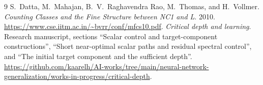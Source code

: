 \documentclass[11pt]{article}
\theoremstyle{remark}\newtheorem{remark}[theorem]{Remark}
\begin{document}
\begin{thebibliography}{9}
S.~Datta, M.~Mahajan, B.~V.~Raghavendra Rao, M.~Thomas, and H.~Vollmer.
\emph{Counting Classes and the Fine Structure between NC1 and L}.
2010. \url{https://www.cse.iitm.ac.in/~bvrr/conf/mfcs10.pdf}.
\emph{Critical depth and learning}.
Research manuscript, sections ``Scalar control and target-component
constructions'', ``Short near-optimal scalar paths and residual spectral
control'', and ``The initial target component and the sufficient depth''.
\url{https://github.com/kaarelh/AI-works/tree/main/neural-network-generalization/works-in-progress/critical-depth}.
\end{thebibliography}
\end{document}
